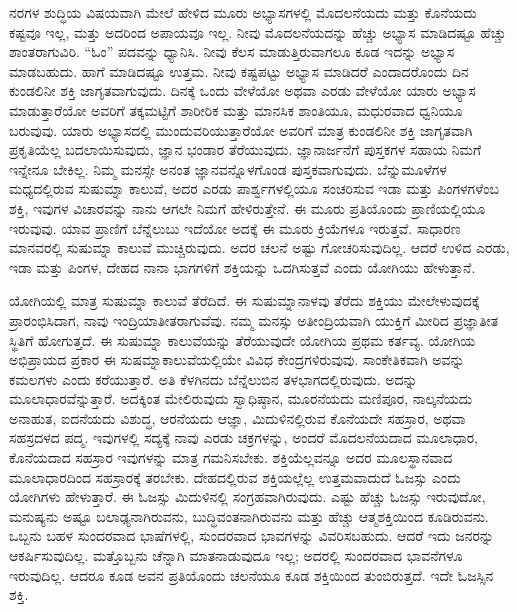 ನರಗಳ ಶುದ್ಧಿಯ ವಿಷಯವಾಗಿ ಮೇಲೆ ಹೇಳಿದ ಮೂರು ಅಭ್ಯಾಸಗಳಲ್ಲಿ ಮೊದಲನೆಯದು ಮತ್ತು ಕೊನೆಯದು ಕಷ್ಟವೂ ಇಲ್ಲ, ಮತ್ತು ಅದರಿಂದ ಅಪಾಯವೂ ಇಲ್ಲ. ನೀವು ಮೊದಲನೆಯದನ್ನು ಹೆಚ್ಚು ಅಭ್ಯಾಸ ಮಾಡಿದಷ್ಟೂ ಹೆಚ್ಚು ಶಾಂತರಾಗುವಿರಿ. “ಓಂ” ಪದವನ್ನು ಧ್ಯಾನಿಸಿ. ನೀವು ಕೆಲಸ ಮಾಡುತ್ತಿರುವಾಗಲೂ ಕೂಡ ಇದನ್ನು ಅಭ್ಯಾಸ ಮಾಡಬಹುದು. ಹಾಗೆ ಮಾಡಿದಷ್ಟೂ ಉತ್ತಮ. ನೀವು ಕಷ್ಟಪಟ್ಟು ಅಭ್ಯಾಸ ಮಾಡಿದರೆ ಎಂದಾದರೊಂದು ದಿನ ಕುಂಡಲಿನೀ ಶಕ್ತಿ ಜಾಗೃತವಾಗುವುದು. ದಿನಕ್ಕೆ ಒಂದು ವೇಳೆಯೋ ಅಥವಾ ಎರಡು ವೇಳೆಯೋ ಯಾರು ಅಭ್ಯಾಸ ಮಾಡುತ್ತಾರೆಯೋ ಅವರಿಗೆ ತಕ್ಕಮಟ್ಟಿಗೆ ಶಾರೀರಿಕ ಮತ್ತು ಮಾನಸಿಕ ಶಾಂತಿಯೂ, ಮಧುರವಾದ ಧ್ವನಿಯೂ ಬರುವುವು. ಯಾರು ಅಭ್ಯಾಸದಲ್ಲಿ ಮುಂದುವರಿಯುತ್ತಾರೆಯೋ ಅವರಿಗೆ ಮಾತ್ರ ಕುಂಡಲಿನೀ ಶಕ್ತಿ ಜಾಗೃತವಾಗಿ ಪ್ರಕೃತಿಯೆಲ್ಲ ಬದಲಾಯಿಸುವುದು, ಜ್ಞಾನ ಭಂಡಾರ ತೆರೆಯುವುದು. ಜ್ಞಾನಾರ್ಜನೆಗೆ ಪುಸ್ತಕಗಳ ಸಹಾಯ ನಿಮಗೆ ಇನ್ನೇನೂ ಬೇಕಿಲ್ಲ. ನಿಮ್ಮ ಮನಸ್ಸೇ ಅನಂತ ಜ್ಞಾನವನ್ನೊಳಗೊಂಡ ಪುಸ್ತಕವಾಗುವುದು. ಬೆನ್ನುಮೂಳೆಗಳ ಮಧ್ಯದಲ್ಲಿರುವ ಸುಷುಮ್ನಾ ಕಾಲುವೆ, ಅದರ ಎರಡು ಪಾರ್ಶ್ವಗಳಲ್ಲಿಯೂ ಸಂಚರಿಸುವ ಇಡಾ ಮತ್ತು ಪಿಂಗಳಗಳೆಂಬ ಶಕ್ತಿ, ಇವುಗಳ ವಿಚಾರವನ್ನು ನಾನು ಆಗಲೇ ನಿಮಗೆ ಹೇಳಿರುತ್ತೇನೆ. ಈ ಮೂರು ಪ್ರತಿಯೊಂದು ಪ್ರಾಣಿಯಲ್ಲಿಯೂ ಇರುವುವು. ಯಾವ ಪ್ರಾಣಿಗೆ ಬೆನ್ನೆಲುಬು ಇದೆಯೋ ಅದಕ್ಕೆ ಈ ಮೂರು ಕ್ರಿಯೆಗಳೂ ಇರುತ್ತವೆ. ಸಾಧಾರಣ ಮಾನವರಲ್ಲಿ ಸುಷುಮ್ನಾ ಕಾಲುವೆ ಮುಚ್ಚಿರುವುದು. ಅದರ ಚಲನೆ ಅಷ್ಟು ಗೋಚರಿಸುವುದಿಲ್ಲ. ಆದರೆ ಉಳಿದ ಎರಡು, ಇಡಾ ಮತ್ತು ಪಿಂಗಳ, ದೇಹದ ನಾನಾ ಭಾಗಗಳಿಗೆ ಶಕ್ತಿಯನ್ನು ಒದಗಿಸುತ್ತವೆ ಎಂದು ಯೋಗಿಯು ಹೇಳುತ್ತಾನೆ. 

ಯೋಗಿಯಲ್ಲಿ ಮಾತ್ರ ಸುಷುಮ್ನಾ ಕಾಲುವೆ ತೆರೆದಿದೆ. ಈ ಸುಷುಮ್ನಾನಾಳವು ತೆರೆದು ಶಕ್ತಿಯು ಮೇಲೇಳುವುದಕ್ಕೆ ಪ್ರಾರಂಭಿಸಿದಾಗ, ನಾವು ಇಂದ್ರಿಯಾತೀತರಾಗುವೆವು. ನಮ್ಮ ಮನಸ್ಸು ಅತೀಂದ್ರಿಯವಾಗಿ ಯುಕ್ತಿಗೆ ಮೀರಿದ ಪ್ರಜ್ಞಾತೀತ ಸ್ಥಿತಿಗೆ ಹೋಗುತ್ತದೆ. ಈ ಸುಷುಮ್ನಾ ಕಾಲುವೆಯನ್ನು ತೆರೆಯುವುದೇ ಯೋಗಿಯ ಪ್ರಥಮ ಕರ್ತವ್ಯ. ಯೋಗಿಯ ಅಭಿಪ್ರಾಯದ ಪ್ರಕಾರ ಈ ಸುಷಮ್ನಾಕಾಲುವೆಯಲ್ಲಿಯೇ ವಿವಿಧ ಕೇಂದ್ರಗಳಿರುವುವು. ಸಾಂಕೇತಿಕವಾಗಿ ಅವನ್ನು ಕಮಲಗಳು ಎಂದು ಕರೆಯುತ್ತಾರೆ. ಅತಿ ಕೆಳಗಿನದು ಬೆನ್ನೆಲುಬಿನ ತಳಭಾಗದಲ್ಲಿರುವುದು. ಅದನ್ನು ಮೂಲಾಧಾರವೆನ್ನುತ್ತಾರೆ. ಅದಕ್ಕಿಂತ ಮೇಲಿರುವುದು ಸ್ವಾಧಿಷ್ಠಾನ, ಮೂರನೆಯದು ಮಣಿಪೂರ, ನಾಲ್ಕನೆಯದು ಅನಾಹುತ, ಐದನೆಯದು ವಿಶುದ್ಧ, ಆರನೆಯದು ಆಜ್ಞಾ, ಮಿದುಳಿನಲ್ಲಿರುವ ಕೊನೆಯದೇ ಸಹಸ್ರಾರ, ಅಥವಾ ಸಹಸ್ರದಳದ ಪದ್ಮ. ಇವುಗಳಲ್ಲಿ ಸದ್ಯಕ್ಕೆ ನಾವು ಎರಡು ಚಕ್ರಗಳನ್ನು, ಅಂದರೆ ಮೊದಲನೆಯದಾದ ಮೂಲಾಧಾರ, ಕೊನೆಯದಾದ ಸಹಸ್ರಾರ ಇವುಗಳನ್ನು ಮಾತ್ರ ಗಮನಿಸಬೇಕು. ಶಕ್ತಿಯೆಲ್ಲವನ್ನೂ ಅದರ ಮೂಲಸ್ಥಾನವಾದ ಮೂಲಾಧಾರದಿಂದ ಸಹಸ್ರಾರಕ್ಕೆ ತರಬೇಕು. ದೇಹದಲ್ಲಿರುವ ಶಕ್ತಿಯಲ್ಲೆಲ್ಲ ಉತ್ತಮವಾದುದೆ ಓಜಸ್ಸು ಎಂದು ಯೋಗಿಗಳು ಹೇಳುತ್ತಾರೆ. ಈ ಓಜಸ್ಸು ಮಿದುಳಿನಲ್ಲಿ ಸಂಗ್ರಹವಾಗಿರುವುದು. ಎಷ್ಟು ಹೆಚ್ಚು ಓಜಸ್ಸು ಇರುವುದೋ, ಮನುಷ್ಯನು ಅಷ್ಟೂ ಬಲಾಢ್ಯನಾಗಿರುವನು, ಬುದ್ಧಿವಂತನಾಗಿರುವನು ಮತ್ತು ಹೆಚ್ಚು ಆತ್ಮಶಕ್ತಿಯಿಂದ ಕೂಡಿರುವನು. ಒಬ್ಬನು ಬಹಳ ಸುಂದರವಾದ ಭಾಷೆಗಳಲ್ಲಿ, ಸುಂದರವಾದ ಭಾವಗಳನ್ನು ವಿವರಿಸಬಹುದು. ಆದರೆ ಇದು ಜನರನ್ನು ಆಕರ್ಷಿಸುವುದಿಲ್ಲ. ಮತ್ತೊಬ್ಬನು ಚೆನ್ನಾಗಿ ಮಾತನಾಡುವುದೂ ಇಲ್ಲ; ಅದರಲ್ಲಿ ಸುಂದರವಾದ ಭಾವನೆಗಳೂ ಇರುವುದಿಲ್ಲ. ಆದರೂ ಕೂಡ ಅವನ ಪ್ರತಿಯೊಂದು ಚಲನೆಯೂ ಕೂಡ ಶಕ್ತಿಯಿಂದ ತುಂಬಿರುತ್ತದೆ. ಇದೇ ಓಜಸ್ಸಿನ ಶಕ್ತಿ. 

